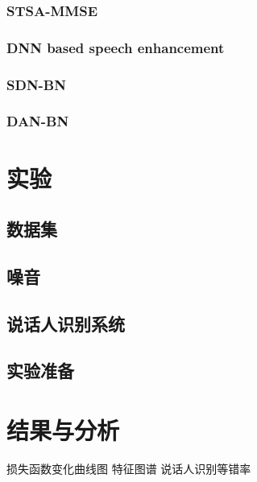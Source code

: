 \documentclass[a4paper,oneside,12pt]{book}
\begin{document}
\subsection{STSA-MMSE}

\subsection{DNN based speech enhancement}

\subsection{SDN-BN}

\subsection{DAN-BN}

\chapter{实验}
\section{数据集}
\section{噪音}
\section{说话人识别系统}
\section{实验准备}


\chapter{结果与分析}



损失函数变化曲线图
特征图谱
说话人识别等错率

 
\end{document}
